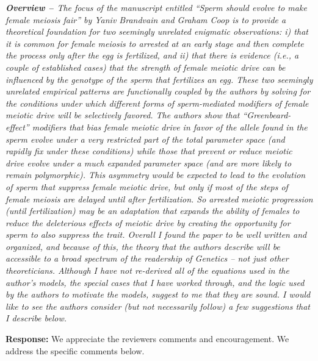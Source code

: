 \documentclass[12pt,letterpaper]{article}
\begin{document}
\emph{{\bf{Overview -- }} 
The focus of the manuscript entitled  ``Sperm should evolve to make female meiosis
fair'' by Yaniv Brandvain and Graham Coop is to provide a theoretical foundation
for two seemingly unrelated enigmatic observations: i) that it is common for
female meiosis to arrested at an early stage and then complete the process only
after the egg is fertilized, and ii) that there is evidence (i.e., a couple of
established cases) that the strength of female meiotic drive can be influenced
by the genotype of the sperm that fertilizes an egg.  These two seemingly
unrelated empirical patterns are functionally coupled by the authors by solving
for the conditions under which different forms of sperm-mediated modifiers of
female meiotic drive will be selectively favored.  The authors show that
``Greenbeard-effect'' modifiers that bias female meiotic drive in favor of the
allele found in the sperm evolve under a very restricted part of the total
parameter space (and rapidly fix under these conditions) while those that
prevent or reduce meiotic drive evolve under a much expanded parameter space
(and are more likely to remain polymorphic).  This asymmetry would be expected
to lead to the evolution of sperm that suppress female meiotic drive, but only
if most of the steps of female meiosis are delayed until after fertilization. So
arrested meiotic progression (until fertilization) may be an adaptation that
expands the ability of females to reduce the deleterious effects of meiotic
drive by creating the opportunity for sperm to also suppress the trait. 
	 Overall I found the paper to be well written and organized, and because of
this, the theory that the authors describe will be accessible to a broad
spectrum of the readership of Genetics -- not just other theoreticians.  Although
I have not re-derived all of the equations used in the author's models, the
special cases that I have worked through, and the logic used by the authors to
motivate the models, suggest to me that they are sound. I would like to see the
authors consider (but not necessarily follow) a few suggestions that I describe
below.  
}


{\bf{Response:}} We appreciate the reviewers comments and
encouragement. 
We address the specific comments below.
\end{document}
